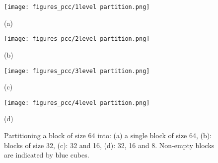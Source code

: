 \begin{figure}
%
\captionsetup{singlelinecheck = false, format= hang, justification=raggedright, font=small, labelsep=space}
\begin{minipage}[b]{.24\linewidth}
  \centering
  \centerline{\texttt{[image: figures\_pcc/1level partition.png]}}
  \centerline{(a)}\medskip
\end{minipage}
\hfill
\begin{minipage}[b]{0.24\linewidth}
  \centering
  \centerline{\texttt{[image: figures\_pcc/2level partition.png]}}
  \centerline{(b) }\medskip
\end{minipage}
%
\hfill
\begin{minipage}[b]{0.24\linewidth}
  \centering
  \centerline{\texttt{[image: figures\_pcc/3level partition.png]}}
  \centerline{(c) }\medskip
\end{minipage}
%
\hfill
\begin{minipage}[b]{0.24\linewidth}
  \centering
  \centerline{\texttt{[image: figures\_pcc/4level partition.png]}}
  \centerline{(d)}\medskip
\end{minipage}
%
\caption{Partitioning a block of size 64 into: (a) a single block of size 64, (b): blocks of size 32, (c): 32 and 16, (d): 32, 16 and 8. Non-empty blocks are indicated by blue cubes.}
\label{fig:4levelpartiitoning}
%
\end{figure}
\setlength{\textfloatsep}{20}